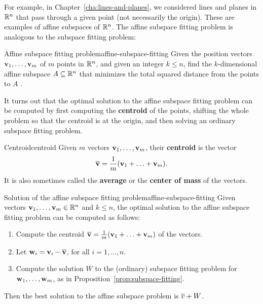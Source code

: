 For example, in Chapter~\ref{cha:lines-and-planes}, we considered
lines and planes in $\mathbb{R}^n$ that pass through a given point (not
necessarily the origin). These are examples of affine subspaces of
$\mathbb{R}^n$. The affine subspace fitting problem is analogous to the
subspace fitting problem:

\begin{problem}{Affine subspace fitting problem}{affine-subspace-fitting}
  Given the position vectors $\vect{v}_1,\ldots,\vect{v}_m$ of $m$
  points in $\mathbb{R}^n$, and given an integer $k\leq n$, find the
  $k$-dimensional affine subspace $A\subseteq\mathbb{R}^n$ that minimizes the
  total squared distance from the points to $A$%
  .
\end{problem}

It turns out that the optimal solution to the affine subspace fitting
problem can be computed by first computing the \textbf{centroid} of
the points, shifting the whole problem so that the centroid is at the
origin, and then solving an ordinary subspace fitting problem.

\begin{definition}{Centroid}{centroid}
  Given $m$ vectors $\vect{v}_1,\ldots,\vect{v}_m$, their
  \textbf{centroid}%
   is the vector
  \begin{equation*}
    \centroid{\vect{v}} = \frac{1}{m}(\vect{v}_1+\ldots+\vect{v}_m).
  \end{equation*}
  It is also sometimes called the \textbf{average}%
   or the \textbf{center of mass}%
   of the vectors.
\end{definition}

\begin{proposition}{Solution of the affine subspace fitting problem}{affine-subspace-fitting}
  Given vectors $\vect{v}_1,\ldots,\vect{v}_m\in\R^n$ and $k\leq n$,
  the optimal solution to the affine subspace fitting problem can be
  computed as follows:
  \begin{enumerate}
    \item Compute the centroid $\centroid{\vect{v}} =
      \frac{1}{m}(\vect{v}_1+\ldots+\vect{v}_m)$ of the vectors.
    \item Let $\vect{w}_i = \vect{v}_i - \centroid{\vect{v}}$, for all
      $i=1,\ldots,n$.
    \item Compute the solution $W$ to the (ordinary) subspace fitting
      problem for $\vect{w}_1,\ldots,\vect{w}_m$, as in
      Proposition~\ref{prop:subspace-fitting}.
  \end{enumerate}
  Then the best solution to the affine subspace problem is
  $\overline{v} + W$.
\end{proposition}

